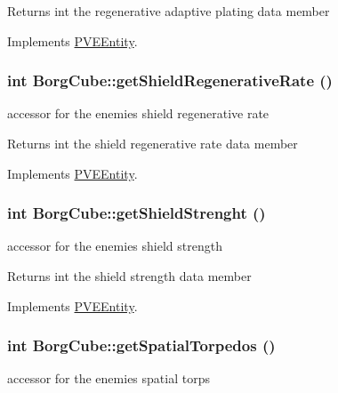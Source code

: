 \begin{DoxyReturn}{Returns}
int the regenerative adaptive plating data member 
\end{DoxyReturn}


Implements \hyperlink{classPVEEntity}{PVEEntity}.

\hypertarget{classBorgCube_a81acc970f271200df76d98f963c2de75}{
\subsubsection[{getShieldRegenerativeRate}]{\setlength{\rightskip}{0pt plus 5cm}int BorgCube::getShieldRegenerativeRate ()}}
\label{d2/d93/classBorgCube_a81acc970f271200df76d98f963c2de75}
accessor for the enemies shield regenerative rate

\begin{DoxyReturn}{Returns}
int the shield regenerative rate data member 
\end{DoxyReturn}


Implements \hyperlink{classPVEEntity}{PVEEntity}.

\hypertarget{classBorgCube_a7a6144a9e194eaccdf5d24965b12903c}{
\subsubsection[{getShieldStrenght}]{\setlength{\rightskip}{0pt plus 5cm}int BorgCube::getShieldStrenght ()}}
\label{d2/d93/classBorgCube_a7a6144a9e194eaccdf5d24965b12903c}
accessor for the enemies shield strength

\begin{DoxyReturn}{Returns}
int the shield strength data member 
\end{DoxyReturn}


Implements \hyperlink{classPVEEntity}{PVEEntity}.

\hypertarget{classBorgCube_aad53d42f485e62d282e3607ce7c33007}{
\subsubsection[{getSpatialTorpedos}]{\setlength{\rightskip}{0pt plus 5cm}int BorgCube::getSpatialTorpedos ()}}
\label{d2/d93/classBorgCube_aad53d42f485e62d282e3607ce7c33007}
accessor for the enemies spatial torps

